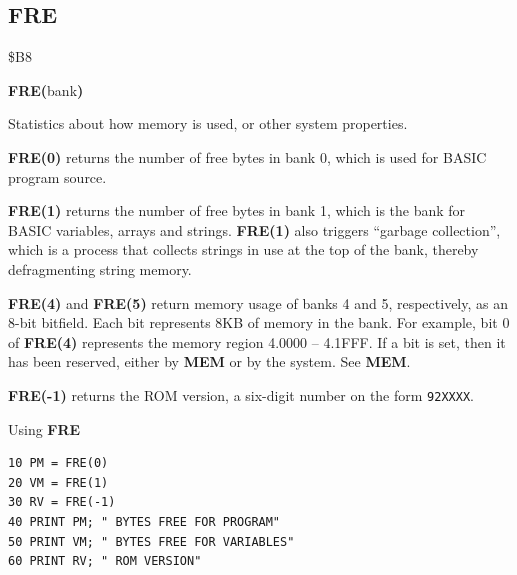 
\newpage
\subsection{FRE}
\begin{description}[leftmargin=2cm,style=nextline]
\item [Token:]    \$B8
\item [Format:]   {\bf FRE(}bank{\bf)}
\item [Returns:]  Statistics about how memory is used, or other system properties.

                  {\bf FRE(0)} returns the number of free bytes in bank 0, which is used for BASIC program source.

                  {\bf FRE(1)} returns the number of free bytes in bank 1, which is the bank for BASIC variables, arrays and strings. {\bf FRE(1)} also triggers ``garbage collection'', which is a process that collects strings in use at the top of the bank, thereby defragmenting string memory.

                  {\bf FRE(4)} and {\bf FRE(5)} return memory usage of banks 4 and 5, respectively, as an 8-bit bitfield. Each bit represents 8KB of memory in the bank. For example, bit 0 of {\bf FRE(4)} represents the memory region 4.0000 -- 4.1FFF. If a bit is set, then it has been reserved, either by {\bf MEM} or by the system. See {\bf MEM}.

                  {\bf FRE(-1)} returns the ROM version, a six-digit number on the form \texttt{92XXXX}.

\item [Example:]  Using {\bf FRE}

\begin{tcolorbox}[colback=black,coltext=white]
\verbatimfont{\codefont}
\begin{verbatim}
10 PM = FRE(0)
20 VM = FRE(1)
30 RV = FRE(-1)
40 PRINT PM; " BYTES FREE FOR PROGRAM"
50 PRINT VM; " BYTES FREE FOR VARIABLES"
60 PRINT RV; " ROM VERSION"
\end{verbatim}
\end{tcolorbox}
\end{description}


\newpage
